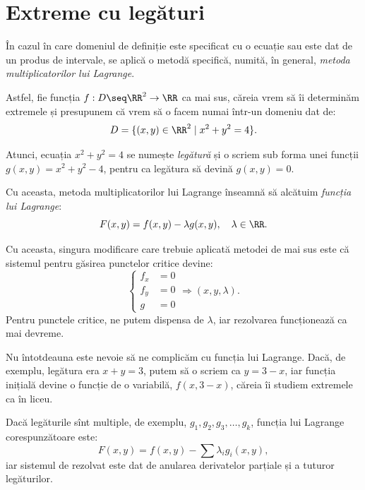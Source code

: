 \chapter{Extreme cu legături}

În cazul în care domeniul de definiție este specificat cu o ecuație sau este
dat de un produs de intervale, se aplică o metodă specifică, numită, în general,
\emph{metoda multiplicatorilor lui Lagrange}.

Astfel, fie funcția $ f : D \seq \RR^2 \to \RR $ ca mai sus, căreia vrem să îi determinăm
extremele și presupunem că vrem să o facem numai într-un domeniu dat de:
\[
  D = \{ (x, y) \in \RR^2 \mid x^2 + y^2 = 4 \}.
\]

Atunci, ecuația $ x^2 + y^2 = 4 $ se numește \emph{legătură} și o scriem sub
forma unei funcții $ g(x, y) = x^2 + y^2 - 4 $, pentru ca legătura să devină
$ g(x, y) = 0 $.

Cu aceasta, metoda multiplicatorilor lui Lagrange înseamnă să alcătuim
\emph{funcția lui Lagrange}\footnotemark:
\[
  F(x, y) = f(x, y) - \lambda g(x, y), \quad \lambda \in \RR.
\]

Cu aceasta, singura modificare care trebuie aplicată metodei de mai sus este
că sistemul pentru găsirea punctelor critice devine:
\[
  \begin{cases}
    f_x &= 0 \\
    f_y &= 0 \\
    g &= 0
  \end{cases} \Longrightarrow (x, y, \lambda).
\]
Pentru punctele critice, ne putem dispensa de $ \lambda $, iar rezolvarea funcționează
ca mai devreme.

\begin{remark}\label{rk:leg-simpla}
  Nu întotdeauna este nevoie să ne complicăm cu funcția lui Lagrange.
  Dacă, de exemplu, legătura era $ x + y = 3 $, putem să o scriem ca $ y = 3 - x $,
  iar funcția inițială devine o funcție de o variabilă, $ f(x, 3 - x) $,
  căreia îi studiem extremele ca în liceu.
\end{remark}

\begin{remark}\label{rk:mm-leg}
  Dacă legăturile sînt multiple, de exemplu, $ g_1, g_2, g_3, \dots, g_k $,
  funcția lui Lagrange corespunzătoare este:
  \[
    F(x, y) = f(x, y) - \sum \lambda_i g_i(x, y),
  \]
  iar sistemul de rezolvat este dat de anularea derivatelor parțiale și
  a tuturor legăturilor.
\end{remark}

